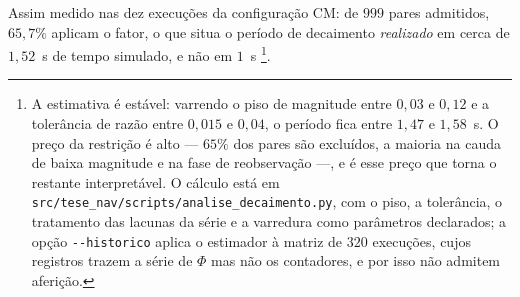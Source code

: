 Assim medido nas dez execuções da configuração CM: de $999$ pares admitidos,
$65{,}7\%$ aplicam o fator, o que situa o período de decaimento \emph{realizado} em
cerca de $1{,}52$~s de tempo simulado, e não em $1$~s%
\footnote{A estimativa é estável: varrendo o piso de magnitude entre $0{,}03$ e $0{,}12$
e a tolerância de razão entre $0{,}015$ e $0{,}04$, o período fica entre $1{,}47$ e
$1{,}58$~s. O preço da restrição é alto --- $65\%$ dos pares são excluídos, a maioria na
cauda de baixa magnitude e na fase de reobservação ---, e é esse preço que torna o
restante interpretável. O cálculo está em
\texttt{src/tese\_nav/scripts/analise\_decaimento.py}, com o piso, a tolerância, o
tratamento das lacunas da série e a varredura como parâmetros declarados; a opção
\texttt{-{}-historico} aplica o estimador à matriz de $320$ execuções, cujos registros
trazem a série de $\Phi$ mas não os contadores, e por isso não admitem aferição.}. %
